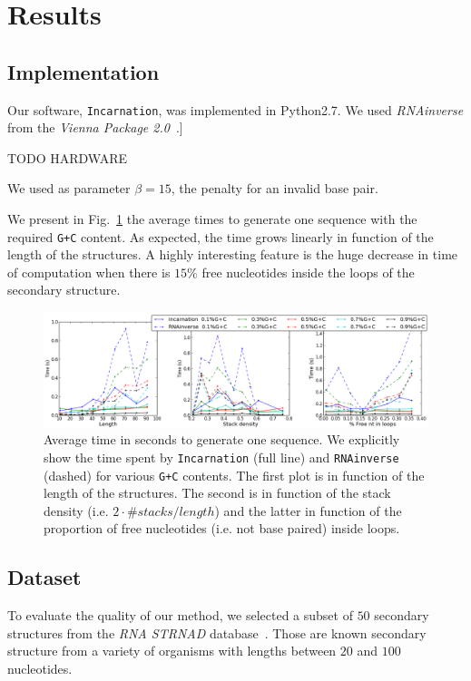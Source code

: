\section{Results}
\label{sec:results}

\subsection{Implementation}
\label{sec:implementation}
Our software, \texttt{Incarnation}, was implemented in Python2.7. We used
\emph{RNAinverse} from the \textit{Vienna Package 2.0}~\cite{Hofacker:1994}.]

TODO HARDWARE

 We used as parameter $\beta=15$, the penalty for an invalid base pair.



We present in Fig.~\ref{fig:time} the average times to generate one sequence
with the required \texttt{G+C} content. As expected, the time grows linearly
in function of the length of the structures.  A highly interesting feature
is the huge decrease in time of computation when there is $15\%$ free 
nucleotides inside the loops of the secondary structure.

\begin{figure}[ht!]
	\centering
	\includegraphics[scale=0.45]{Figures/time_rnastrand_clustered_rnainverse_100samples_fix}
	\caption{Average time in seconds to generate one sequence. We explicitly show 
	the time spent by \texttt{Incarnation} (full line) and \texttt{RNAinverse} (dashed) for various \texttt{G+C} contents. The first plot is in function
	of the length of the structures. The second is in function of the stack
	density (i.e. $2\cdot\#stacks/length$) and the latter in function of 
	the proportion of free nucleotides (i.e. not base paired) inside loops.}
	\label{fig:time}	
\end{figure}



\subsection{Dataset}
To evaluate the quality of our method, we selected a subset of $50$ secondary
structures from the \textit{RNA STRNAD} database~\cite{andronescu2008rna}.
Those are known secondary structure from a variety of organisms with 
 lengths between $20$ and $100$ nucleotides. 
 
